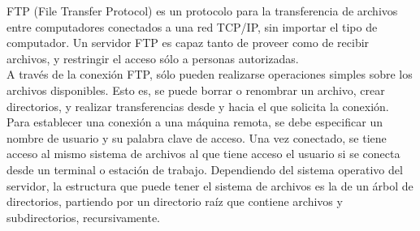 FTP (File Transfer Protocol) es un protocolo para la transferencia de archivos entre computadores conectados a una red TCP/IP, sin importar el tipo de computador. Un servidor FTP es capaz tanto de proveer como de recibir archivos, y restringir el acceso sólo a personas autorizadas.\\[10pt]
A través de la conexión FTP, sólo pueden realizarse operaciones simples sobre los archivos disponibles. Esto es, se puede borrar o renombrar un archivo, crear directorios, y realizar transferencias desde y hacia el que solicita la conexión.\\[10pt]
Para establecer una conexión a una máquina remota, se debe especificar un nombre de usuario y su palabra clave de acceso. Una vez conectado, se tiene acceso al mismo sistema de archivos al que tiene acceso el usuario si se conecta desde un terminal o estación de trabajo. Dependiendo del sistema operativo del servidor, la estructura que puede tener el sistema de archivos es la de un árbol de directorios, partiendo por un directorio raíz que contiene archivos y subdirectorios, recursivamente.\\[10pt]
